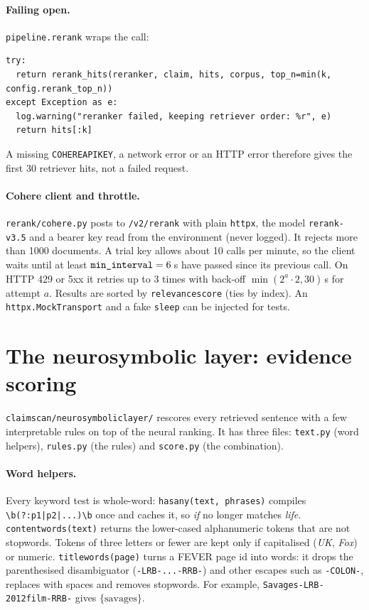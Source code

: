 \documentclass[11pt,a4paper]{article}
\makeatletter
\DeclareRobustCommand{\_}{\ifmmode\nfss@text{\textunderscore}\else\textunderscore\allowbreak\fi}
\newcommand{\file}[1]{\texttt{#1}}
\makeatother
\begin{document}
\paragraph{Failing open.} \texttt{pipeline.\_rerank} wraps the call:
\begin{lstlisting}
try:
  return rerank_hits(reranker, claim, hits, corpus, top_n=min(k, config.rerank_top_n))
except Exception as e:
  log.warning("reranker failed, keeping retriever order: %r", e)
  return hits[:k]
\end{lstlisting}
A missing \texttt{COHERE\_API\_KEY}, a network error or an HTTP error therefore gives the first 30 retriever hits,
not a failed request.

\paragraph{Cohere client and throttle.} \file{rerank/cohere.py} posts to \texttt{/v2/rerank} with plain
\texttt{httpx}, the model \texttt{rerank-v3.5} and a bearer key read from the environment (never logged). It rejects
more than 1000 documents. A trial key allows about 10 calls per minute, so the client waits until at least
$\texttt{min\_interval}=6$\,s have passed since its previous call. On HTTP 429 or 5xx it retries up to 3 times with
back-off $\min(2^{a}\cdot 2, 30)$\,s for attempt $a$. Results are sorted by \texttt{relevance\_score} (ties by index).
An \texttt{httpx.MockTransport} and a fake \texttt{sleep} can be injected for tests.

\section{The neurosymbolic layer: evidence scoring}\label{sec:ns}

\file{claimscan/neurosymbolic\_layer/} rescores every retrieved sentence with a few interpretable rules on top of
the neural ranking. It has three files: \file{text.py} (word helpers), \file{rules.py} (the rules) and
\file{score.py} (the combination).

\paragraph{Word helpers.} Every keyword test is whole-word: \texttt{has\_any(text, phrases)} compiles
\verb!\b(?:p1|p2|...)\b! once and caches it, so \emph{if} no longer matches \emph{life}.
\texttt{content\_words(text)} returns the lower-cased alphanumeric tokens that are not stopwords. Tokens of three
letters or fewer are kept only if capitalised (\emph{UK}, \emph{Fox}) or numeric. \texttt{title\_words(page)} turns a
FEVER page id into words: it drops the parenthesised disambiguator (\texttt{-LRB-...-RRB-}) and other escapes such as
\texttt{-COLON-}, replaces \texttt{\_} with spaces and removes stopwords. For example,
\texttt{Savages\_-LRB-2012\_film-RRB-} gives $\{\text{savages}\}$.
\end{document}
